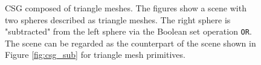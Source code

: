 \begin{figure}[h]
	\centering
	\hfil
	\caption{CSG composed of triangle meshes. The figures show a scene with two spheres described as triangle meshes. The right sphere is "subtracted" from the left sphere via the Boolean set operation \texttt{OR}. The scene can be regarded as the counterpart of the scene shown in Figure \ref{fig:csg_sub} for triangle mesh primitives.}
	\label{fig:csg_mesh_results}
\end{figure}

